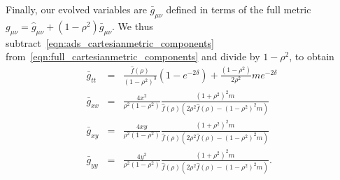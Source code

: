 \documentclass[prl,twocolumn,superscriptaddress]{revtex4-1}
\begin{document}
Finally, our evolved variables are $\bar{g}_{\mu\nu}$ defined in terms of the full metric $g_{\mu\nu}=\hat{g}_{\mu\nu}+(1-\rho^2)\bar{g}_{\mu\nu}$.
We thus subtract~\eqref{eqn:ads_cartesianmetric_components} from~\eqref{eqn:full_cartesianmetric_components} and divide by $1-\rho^2$, to obtain
\begin{eqnarray}\label{eqn:barred_cartesianmetric_components}
\bar{g}_{tt} &=& \frac{\hat{f}(\rho)}{(1-\rho^2)^3} (1-e^{-2\delta}) + \frac{(1-\rho^2)}{2\rho^2} m e^{-2\delta} \nonumber \\
\bar{g}_{xx} &=& \frac{4x^2}{\rho^2(1-\rho^2)} \frac{(1+\rho^2)^2 m}{\hat{f}(\rho) \left( 2\rho^2\hat{f}(\rho)-(1-\rho^2)^2m \right)} \nonumber \\
\bar{g}_{xy} &=& \frac{4xy}{\rho^2(1-\rho^2)} \frac{(1+\rho^2)^2 m}{\hat{f}(\rho) \left( 2\rho^2\hat{f}(\rho)-(1-\rho^2)^2m \right)} \nonumber \\
\bar{g}_{yy} &=& \frac{4y^2}{\rho^2(1-\rho^2)} \frac{(1+\rho^2)^2 m}{\hat{f}(\rho) \left( 2\rho^2\hat{f}(\rho)-(1-\rho^2)^2m \right)}.
\end{eqnarray}



\end{document}
